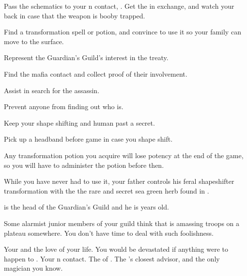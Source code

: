 \documentclass[char]{NeptuneBall}
\begin{document}
\begin{itemz}[Goals]
  \item Pass the schematics to your \pPacifica{}n contact, \cSpy{}. Get the \iBattlePlan{} in exchange, and watch your back in case \cSpy{\they}  that the weapon is booby trapped.
  \item Find a transformation spell or potion, and convince \cQueen{} to use it so your family can move to the surface.
  \item Represent the Guardian's Guild's interest in the treaty.
  \item Find the mafia contact and collect proof of their involvement.
  \item Assist \cQueen{} in \cQueen{\their} search for the assassin.
  \item Prevent anyone from finding out who \cQueen{} is.
  \item Keep your shape shifting and human past a secret.
\end{itemz}

\begin{itemz}[Notes]
  \item Pick up a  headband before game in case you shape shift.
  \item Any transformation potion you acquire will lose potency at the end of the game, so you will have to administer the potion before then.
\end{itemz}

\begin{itemz}[Trivia]
	\item While you have never had to use it, your father controls his feral shapeshifter transformation with the the rare and secret sea green herb found in \pAntiLycanthropyHerbs{}. 
  \item \cKratos{} is the head of the Guardian's Guild and he is \cKratos{\MYnumber} years old.
	\item Some alarmist junior members of your guild think that \pIndia{} is amassing troops on a plateau somewhere. You don't have time to deal with such foolishness.
\end{itemz}

\begin{contacts}
  \contact{\cQueen{}} Your \cQueen{\spouse} and the love of your life. You would be devastated if anything were to happen to \cQueen{\them}.
  \contact{\cSpy{}} Your \pPacifica{}n contact.
  \contact{\cKing{}} The \cKing{\King} of \pAtlantis{}.
  \contact{\cManta{}} The \cKing{\King}'s closest advisor, and the only magician you know.
\end{contacts}
\end{document}
